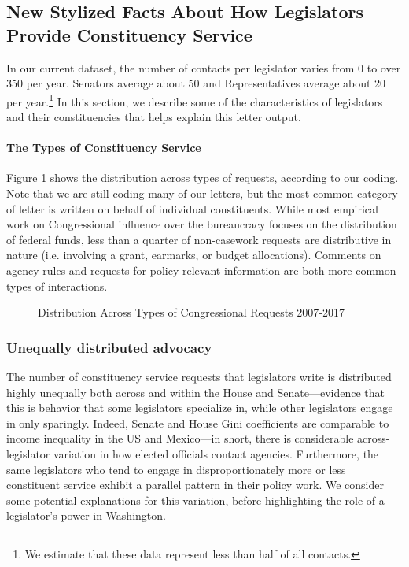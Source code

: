\documentclass{article}
\begin{document}
\subsection{New Stylized Facts About How Legislators Provide Constituency Service}
In our current dataset, the number of contacts per legislator varies from 0 to over 350 per year. Senators average about 50 and Representatives average about 20 per year.\footnote{We estimate that these data represent less than half of all contacts.} In this section, we describe some of the characteristics of legislators and their constituencies that helps explain this letter output.  

\paragraph{The Types of Constituency Service} Figure \ref{f:fig2} shows the distribution across types of requests, according to our coding.  Note that we are still coding many of our letters, but the most common category of letter is written on behalf of individual constituents. While most empirical work on Congressional influence over the bureaucracy focuses on the distribution of federal funds, less than a quarter of non-casework requests are distributive in nature (i.e. involving a grant, earmarks, or budget allocations). Comments on agency rules and requests for policy-relevant information are both more common types of interactions. 


\begin{figure}[hbt!]
\centering
\caption{Distribution Across Types of Congressional Requests 2007-2017} \label{f:fig2}
\end{figure}


\subsubsection{Unequally distributed advocacy}

The number of constituency service requests that legislators write is distributed highly unequally both across and within the House and Senate---evidence that this is behavior that some legislators specialize in, while other legislators engage in only sparingly. Indeed, Senate and House Gini coefficients are comparable to income inequality in the US and Mexico---in short, there is considerable across-legislator variation in how elected officials contact agencies. Furthermore, the same legislators who tend to engage in disproportionately more or less constituent service exhibit a parallel pattern in their policy work. We consider some potential explanations for this variation, before highlighting the role of a legislator's power in Washington.  
\end{document}
